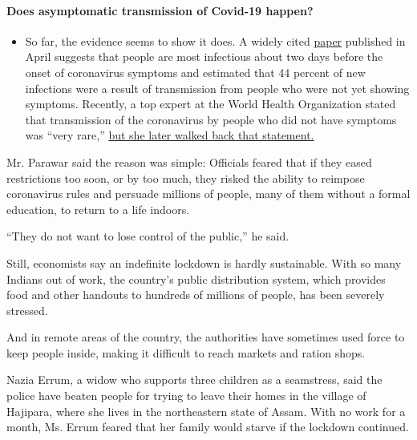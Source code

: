 \begin{itemize}
{  \paragraph{Does asymptomatic transmission of Covid-19
  happen?}\label{does-asymptomatic-transmission-of-covid-19-happen}}

  \begin{itemize}
  \tightlist
  \item
    So far, the evidence seems to show it does. A widely cited
    \href{https://www.nature.com/articles/s41591-020-0869-5}{paper}
    published in April suggests that people are most infectious about
    two days before the onset of coronavirus symptoms and estimated that
    44 percent of new infections were a result of transmission from
    people who were not yet showing symptoms. Recently, a top expert at
    the World Health Organization stated that transmission of the
    coronavirus by people who did not have symptoms was ``very rare,''
    \href{https://www.nytimes.com/2020/06/09/world/coronavirus-updates.html?action=click\&pgtype=Article\&state=default\&region=MAIN_CONTENT_3\&context=storylines_faq\#link-1f302e21}{but
    she later walked back that statement.}
  \end{itemize}
\end{itemize}

Mr. Parawar said the reason was simple: Officials feared that if they
eased restrictions too soon, or by too much, they risked the ability to
reimpose coronavirus rules and persuade millions of people, many of them
without a formal education, to return to a life indoors.

``They do not want to lose control of the public,'' he said.

Still, economists say an indefinite lockdown is hardly sustainable. With
so many Indians out of work, the country's public distribution system,
which provides food and other handouts to hundreds of millions of
people, has been severely stressed.

And in remote areas of the country, the authorities have sometimes used
force to keep people inside, making it difficult to reach markets and
ration shops.

Nazia Errum, a widow who supports three children as a seamstress, said
the police have beaten people for trying to leave their homes in the
village of Hajipara, where she lives in the northeastern state of Assam.
With no work for a month, Ms. Errum feared that her family would starve
if the lockdown continued.

